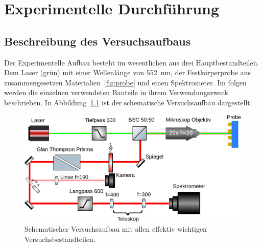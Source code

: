 \chapter{Experimentelle Durchführung}

\section{Beschreibung des Versuchsaufbaus}
\label{sec:Beschreibung des Versuchsaufbaus}
Der Experimentelle Aufbau besteht im wesentlichen aus drei Hauptbestandteilen.
Dem Laser (grün) mit einer Wellenlänge von \SI{552}{\nano\meter}, der Festkörperprobe aus zusammengesetzen
Materialien~\ref{fig:probe} und einen Spektrometer.
Im folgen werden die einzelnen verwendeten Bauteile in ihrem Verwendungszweck beschrieben.
In Abbildung~\ref{fig:aufbau} ist der schematische Versuchsaufbau dargestellt.
\begin{figure}
    \centering
    \includegraphics[scale=0.75]{./Plots/setup.pdf}
    \caption{Schematischer Versuchsaufbau mit allen effektiv wichtigen Versuchsbestandteilen.}
    \label{fig:aufbau}
\end{figure}
\FloatBarrier

